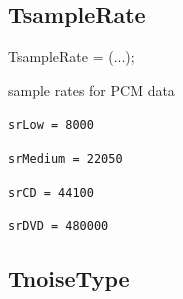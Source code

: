 \documentclass{report}
\newif\ifpdf
\begin{document}
\subsection*{TsampleRate}
\fi
\label{morse.base-TsampleRate}
\begin{list}{}{
\setlength{\itemindent}{0cm}
\setlength{\listparindent}{0cm}
\setlength{\leftmargin}{\evensidemargin}
\addtolength{\leftmargin}{\tmplength}
\settowidth{\labelsep}{X}
\addtolength{\leftmargin}{\labelsep}
\setlength{\labelwidth}{\tmplength}
}
\item[\textbf{Declaration}\hfill]
\ifpdf
\begin{flushleft}
\fi
\begin{ttfamily}
TsampleRate = (...);\end{ttfamily}

\ifpdf
\end{flushleft}
\fi

\par
\item[\textbf{Description}]
sample rates for PCM data\item[\textbf{Values}]
\begin{description}
\item[\texttt{srLow = 8000}] \label{morse.base-srLow}
\index{}
 
\item[\texttt{srMedium = 22050}] \label{morse.base-srMedium}
\index{}
 
\item[\texttt{srCD = 44100}] \label{morse.base-srCD}
\index{}
 
\item[\texttt{srDVD = 480000}] \label{morse.base-srDVD}
\index{}
 
\end{description}


\end{list}
\ifpdf
\subsection*{\large{\textbf{TnoiseType}}\normalsize\hspace{1ex}\hrulefill}
\else
\end{document}
